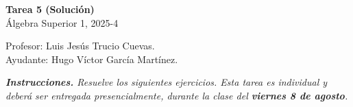 \documentclass[letterpaper,DIV=14,headsepline,12pt]{scrartcl}
\begin{document}
    \begin{center}
        {\fontsize{30}{60}\rmfamily \textbf{Tarea 5 (Solución)}} \\ \vspace{.2cm}
        Álgebra Superior 1, 2025-4
    \end{center}
    \begin{flushright}
        \footnotesize \hfill Profesor: Luis Jesús Trucio Cuevas.\\
        \hfill Ayudante: Hugo Víctor García Martínez.
    \end{flushright}

    \noindent\textit{\textbf{Instrucciones.} Resuelve los siguientes ejercicios. Esta tarea es individual y deberá ser entregada presencialmente, durante la clase del \textbf{viernes 8 de agosto}.}\vspace{.4cm}
\end{document}
